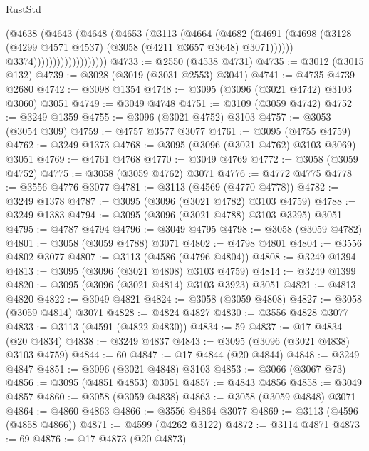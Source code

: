\begin{lexlean}{RustStd}
\begin{coremodule}
{\begin{coremodule}
{{{{{{{{{{{{{{{{{{{{{{{{{{{{{{{{                                (@4638
                                  (@4643
                                    (@4648
                                      (@4653
                                        (@3113
                                          (@4664
                                            (@4682
                                              (@4691
                                                (@4698
                                                  (@3128
                                                    (@4299 @4571 @4537)
                                                    (@3058 (@4211 @3657 @3648) @3071))))))
                                          @3374)))))))))))))))))))
@4733 := @2550 (@4538 @4731)
@4735 := @3012 (@3015 @132)
@4739 := @3028 (@3019 (@3031 @2553) @3041)
@4741 := @4735 @4739 @2680
@4742 := @3098 @1354
@4748 := @3095 (@3096 (@3021 @4742) @3103 @3060) @3051
@4749 := @3049 @4748
@4751 := @3109 (@3059 @4742)
@4752 := @3249 @1359
@4755 := @3096 (@3021 @4752) @3103
@4757 := @3053 (@3054 @309)
@4759 := @4757 @3577 @3077
@4761 := @3095 (@4755 @4759)
@4762 := @3249 @1373
@4768 := @3095 (@3096 (@3021 @4762) @3103 @3069) @3051
@4769 := @4761 @4768
@4770 := @3049 @4769
@4772 := @3058 (@3059 @4752)
@4775 := @3058 (@3059 @4762) @3071
@4776 := @4772 @4775
@4778 := @3556 @4776 @3077
@4781 := @3113 (@4569 (@4770 @4778))
@4782 := @3249 @1378
@4787 := @3095 (@3096 (@3021 @4782) @3103 @4759)
@4788 := @3249 @1383
@4794 := @3095 (@3096 (@3021 @4788) @3103 @3295) @3051
@4795 := @4787 @4794
@4796 := @3049 @4795
@4798 := @3058 (@3059 @4782)
@4801 := @3058 (@3059 @4788) @3071
@4802 := @4798 @4801
@4804 := @3556 @4802 @3077
@4807 := @3113 (@4586 (@4796 @4804))
@4808 := @3249 @1394
@4813 := @3095 (@3096 (@3021 @4808) @3103 @4759)
@4814 := @3249 @1399
@4820 := @3095 (@3096 (@3021 @4814) @3103 @3923) @3051
@4821 := @4813 @4820
@4822 := @3049 @4821
@4824 := @3058 (@3059 @4808)
@4827 := @3058 (@3059 @4814) @3071
@4828 := @4824 @4827
@4830 := @3556 @4828 @3077
@4833 := @3113 (@4591 (@4822 @4830))
@4834 := 59
@4837 := @17 @4834 (@20 @4834)
@4838 := @3249 @4837
@4843 := @3095 (@3096 (@3021 @4838) @3103 @4759)
@4844 := 60
@4847 := @17 @4844 (@20 @4844)
@4848 := @3249 @4847
@4851 := @3096 (@3021 @4848) @3103
@4853 := @3066 (@3067 @73)
@4856 := @3095 (@4851 @4853) @3051
@4857 := @4843 @4856
@4858 := @3049 @4857
@4860 := @3058 (@3059 @4838)
@4863 := @3058 (@3059 @4848) @3071
@4864 := @4860 @4863
@4866 := @3556 @4864 @3077
@4869 := @3113 (@4596 (@4858 @4866))
@4871 := @4599 (@4262 @3122)
@4872 := @3114 @4871
@4873 := 69
@4876 := @17 @4873 (@20 @4873)
}}}}}}}}}}}}}}}}}}}}}}}}}}}}}}}}
\end{coremodule}}
\end{coremodule}
\end{lexlean}
